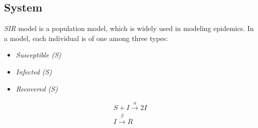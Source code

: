 \subsection{System}
\textit{SIR} model  is a population model, which is widely used in
modeling epidemics. In a  model, each individual is of one
among three types:
\begin{itemize}
    \item \textit{Susceptible (S)}
    \item \textit{Infected (S)}
    \item \textit{Recovered (S)}
\end{itemize}
\begin{align*}
    S + I \xrightarrow{\alpha} 2I \\
    I \xrightarrow{\beta} R
\end{align*}

